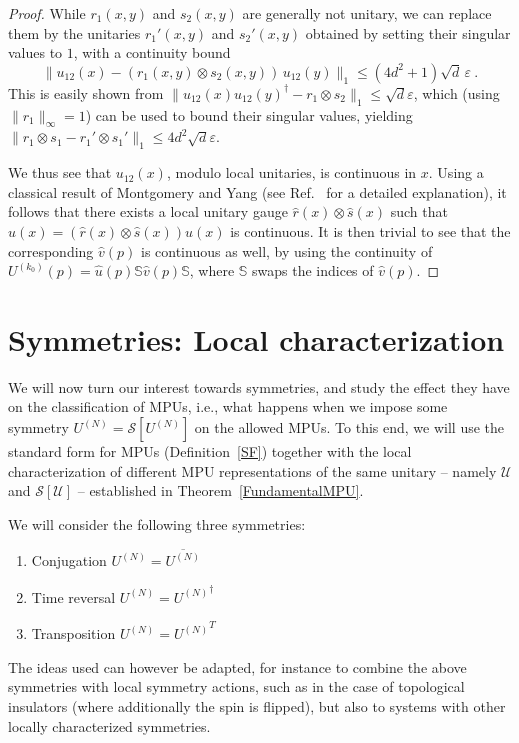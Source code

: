 \documentclass[pra,twocolumn,nofootinbib,superscriptaddress]{revtex4-1}
\begin{document}
\begin{proof}
	While $r_1(x,y)$ and $s_2(x,y)$ are generally not unitary, we can replace
	them by the unitaries $r_1'(x,y)$ and $s_2'(x,y)$ obtained by setting their
	singular values to $1$, with a continuity bound
	\[
		\|u_{12}(x) -
		(r_{1}(x,y)\otimes s_{2}(x,y))\, u_{12}(y) \|_1\le
		(4d^2+1)\sqrt{d}\, \varepsilon\ .
	\]
	This is easily shown from $\|u_{12}(x)u_{12}(y)^\dagger-r_1\otimes
		s_2\|_1\le\sqrt{d}\varepsilon$, which (using $\|r_1\|_\infty=1$) can be
	used to bound their singular values, yielding $\|r_1\otimes
		s_1-r_1'\otimes s_1'\|_1\le 4d^2\sqrt{d}\varepsilon$.

	We thus see that $u_{12}(x)$, modulo local unitaries, is continuous in
	$x$.  Using a classical result of Montgomery and Yang
	\cite{montgomery:existence-of-a-slice} (see
	Ref.~\cite{brendon:compact-transformation-groups} for a detailed explanation),
	it follows that there exists a local unitary gauge $\hat r(x)\otimes \hat
		s(x)$ such that $\hat u(x)=(\hat r(x)\otimes\hat s(x))u(x)$ is continuous.  It is
	then trivial to see that the corresponding $\hat v(p)$ is continuous as well,
	by using the continuity of $U^{(k_0)}(p)= \hat u(p)\mathbb S \hat v(p)\mathbb S$,
	where $\mathbb S$ swaps the indices of $\hat v(p)$.  \end{proof}





\section{\label{sec:sym-local-char}
  Symmetries: Local characterization}

We will now turn our interest towards symmetries, and study the effect
they have on the classification of MPUs, i.e., what happens when we impose
some symmetry $U^{(N)}=\mathcal S[U^{(N)}]$ on the allowed MPUs. To this
end, we will use the standard form for MPUs (Definition~\ref{SF}) together
with the  local characterization of different MPU representations of the
same unitary -- namely $\mathcal U$ and $\mathcal S[\mathcal U]$ --
established in Theorem~\ref{FundamentalMPU}.

We will consider the following three symmetries:
\begin{enumerate}
	\item Conjugation $U^{(N)}=\overline{U^{(N)}}$
	\item Time reversal $U^{(N)}={U^{(N)}}^\dagger$
	\item Transposition $U^{(N)}={U^{(N)}}^{T}$
\end{enumerate}
The ideas used can however be adapted, for instance to combine the above
symmetries with local symmetry actions, such as in the case of
topological insulators (where additionally the spin is flipped), but also
to systems with other locally characterized symmetries.
\end{document}
